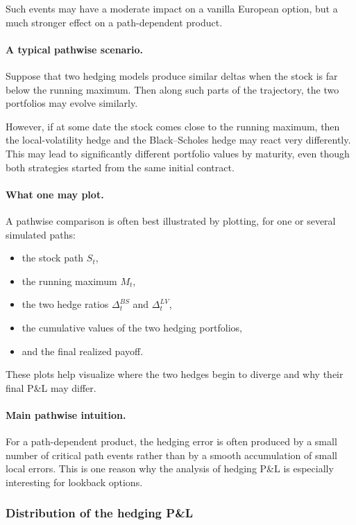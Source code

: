 \documentclass[11pt]{article}
\theoremstyle{plain}
\theoremstyle{definition}
\theoremstyle{remark}
\begin{document}
Such events may have a moderate impact on a vanilla European option, but
a much stronger effect on a path-dependent product.

\paragraph{A typical pathwise scenario.}
Suppose that two hedging models produce similar deltas when the stock is
far below the running maximum.
Then along such parts of the trajectory, the two portfolios may evolve
similarly.

However, if at some date the stock comes close to the running maximum,
then the local-volatility hedge and the Black--Scholes hedge may react
very differently.
This may lead to significantly different portfolio values by maturity,
even though both strategies started from the same initial contract.

\paragraph{What one may plot.}
A pathwise comparison is often best illustrated by plotting, for one or
several simulated paths:
\begin{itemize}[leftmargin=1.4em]
    \item the stock path \(S_t\),
    \item the running maximum \(M_t\),
    \item the two hedge ratios \(\Delta_t^{BS}\) and \(\Delta_t^{LV}\),
    \item the cumulative values of the two hedging portfolios,
    \item and the final realized payoff.
\end{itemize}

These plots help visualize where the two hedges begin to diverge and why
their final P\&L may differ.

\paragraph{Main pathwise intuition.}
For a path-dependent product, the hedging error is often produced by a
small number of critical path events rather than by a smooth accumulation
of small local errors.
This is one reason why the analysis of hedging P\&L is especially
interesting for lookback options.

\subsubsection{Distribution of the hedging P\&L}
\end{document}
